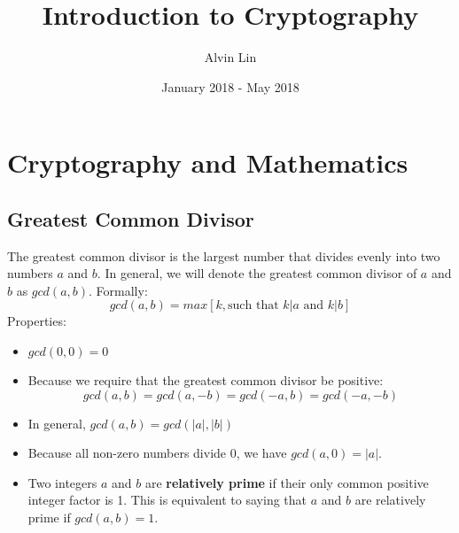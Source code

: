 \documentclass{math}
\title{Introduction to Cryptography}
\author{Alvin Lin}
\date{January 2018 - May 2018}
\begin{document}
\maketitle

\section*{Cryptography and Mathematics}

\subsection*{Greatest Common Divisor}
The greatest common divisor is the largest number that divides evenly into two
numbers \( a \) and \( b \). In general, we will denote the greatest common
divisor of \( a \) and \( b \) as \( gcd(a,b) \). Formally:
\[ gcd(a,b) = max[k, \text{such that } k|a \text{ and } k|b] \]
Properties:
\begin{itemize}
  \item \( gcd(0,0) = 0 \)
  \item Because we require that the greatest common divisor be positive:
  \[ gcd(a,b) = gcd(a,-b) = gcd(-a,b) = gcd(-a,-b) \]
  \item In general, \( gcd(a,b) = gcd(|a|,|b|) \)
  \item Because all non-zero numbers divide 0, we have \( gcd(a,0) = |a| \).
  \item Two integers \( a \) and \( b \) are \textbf{relatively prime} if their
  only common positive integer factor is 1. This is equivalent to saying that
  \( a \) and \( b \) are relatively prime if \( gcd(a,b) = 1 \).
\end{itemize}
\end{document}
